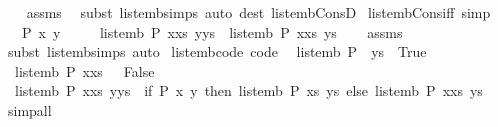 \begin{isabellebody}
%
\isadelimproof
\ \ %
\endisadelimproof
%
\isatagproof
{}\isamarkupfalse%
\ assms\ \isamarkupfalse%
\ {\isacharparenleft}subst\ list{\isacharunderscore}emb{\isachardot}simps{\isacharparenright}\ {\isacharparenleft}auto\ dest{\isacharcolon}\ list{\isacharunderscore}emb{\isacharunderscore}ConsD{\isacharparenright}%
\endisatagproof
{\isafoldproof}%
%
\isadelimproof
\isanewline
%
\endisadelimproof
\isanewline
{}\isamarkupfalse%
\ list{\isacharunderscore}emb{\isacharunderscore}Cons{\isacharunderscore}iff{}\ {\isacharbrackleft}simp{\isacharbrackright}{\isacharcolon}\isanewline
\ \ \ {\isachardoublequoteopen}{\isasymnot}P\ x\ y{\isachardoublequoteclose}\isanewline
\ \ \ \ \ {\isachardoublequoteopen}list{\isacharunderscore}emb\ P\ {\isacharparenleft}x{\isacharhash}xs{\isacharparenright}\ {\isacharparenleft}y{\isacharhash}ys{\isacharparenright}\ {\isasymlongleftrightarrow}\ list{\isacharunderscore}emb\ P\ {\isacharparenleft}x{\isacharhash}xs{\isacharparenright}\ ys{\isachardoublequoteclose}\isanewline
%
\isadelimproof
\ \ %
\endisadelimproof
%
\isatagproof
{}\isamarkupfalse%
\ assms\ \isamarkupfalse%
\ {\isacharparenleft}subst\ list{\isacharunderscore}emb{\isachardot}simps{\isacharparenright}\ auto%
\endisatagproof
{\isafoldproof}%
%
\isadelimproof
\isanewline
%
\endisadelimproof
\isanewline
{}\isamarkupfalse%
\ list{\isacharunderscore}emb{\isacharunderscore}code\ {\isacharbrackleft}code{\isacharbrackright}{\isacharcolon}\isanewline
\ \ {\isachardoublequoteopen}list{\isacharunderscore}emb\ P\ {\isacharbrackleft}{\isacharbrackright}\ ys\ {\isasymlongleftrightarrow}\ True{\isachardoublequoteclose}\isanewline
\ \ {\isachardoublequoteopen}list{\isacharunderscore}emb\ P\ {\isacharparenleft}x{\isacharhash}xs{\isacharparenright}\ {\isacharbrackleft}{\isacharbrackright}\ {\isasymlongleftrightarrow}\ False{\isachardoublequoteclose}\isanewline
\ \ {\isachardoublequoteopen}list{\isacharunderscore}emb\ P\ {\isacharparenleft}x{\isacharhash}xs{\isacharparenright}\ {\isacharparenleft}y{\isacharhash}ys{\isacharparenright}\ {\isasymlongleftrightarrow}\ {\isacharparenleft}if\ P\ x\ y\ then\ list{\isacharunderscore}emb\ P\ xs\ ys\ else\ list{\isacharunderscore}emb\ P\ {\isacharparenleft}x{\isacharhash}xs{\isacharparenright}\ ys{\isacharparenright}{\isachardoublequoteclose}\isanewline
%
\isadelimproof
\ \ %
\endisadelimproof
%
\isatagproof
{}\isamarkupfalse%
\ simp{\isacharunderscore}all%
\endisatagproof
{\isafoldproof}%
%
\isadelimproof

\end{isabellebody}

